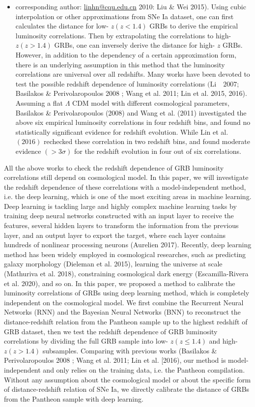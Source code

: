 \documentclass[10pt, a4paper]{article}
\begin{document}
\begin{itemize}
  \item corresponding author: \href{mailto:linhn@cqu.edu.cn}{linhn@cqu.edu.cn} 2010: Liu \& Wei 2015). Using cubic interpolation or other approximations from SNe Ia dataset, one can first calculates the distance for low- $z(z<1.4)$ GRBs to derive the empirical luminosity correlations. Then by extrapolating the correlations to high- $z(z>1.4)$ GRBs, one can inversely derive the distance for high- $z$ GRBs. However, in addition to the dependency of a certain approximation form, there is an underlying assumption in this method that the luminosity correlations are universal over all redshifts. Many works have been devoted to test the possible redshift dependence of luminosity correlations $(\mathrm{Li} \quad 2007$; Basilakos \& Perivolaropoulos 2008 ; Wang et al. 2011; Lin et al. 2015, 2016). Assuming a flat $\Lambda$ CDM model with different cosmological parameters, Basilakos \& Perivolaropoulos (2008) and Wang et al. (2011) investigated the above six empirical luminosity correlations in four redshift bins, and found no statistically significant evidence for redshift evolution. While Lin et al. $(2016)$ rechecked these correlation in two redshift bins, and found moderate evidence $(>3 \sigma)$ for the redshift evolution in four out of six correlations.
\end{itemize}
All the above works to check the redshift dependence of GRB luminosity correlations still depend on cosmological model. In this paper, we will investigate the redshift dependence of these correlations with a model-independent method, i.e. the deep learning, which is one of the most exciting areas in machine learning. Deep learning is tackling large and highly complex machine learning tasks by training deep neural networks constructed with an input layer to receive the features, several hidden layers to transform the information from the previous layer, and an output layer to export the target, where each layer contains hundreds of nonlinear processing neurons (Aurelien 2017). Recently, deep learning method has been widely employed in cosmological researches, such as predicting galaxy morphology (Dieleman et al. 2015), learning the universe at scale (Mathuriva et al. 2018), constraining cosmological dark energy (Escamilla-Rivera et al. 2020), and so on. In this paper, we proposed a method to calibrate the luminosity correlations of GRBs using deep learning method, which is completely independent on the cosmological model. We first combine the Recurrent Neural Networks (RNN) and the Bayesian Neural Networks (BNN) to reconstruct the distance-redshift relation from the Pantheon sample up to the highest redshift of GRB dataset, then we test the redshift dependence of GRB luminosity correlations by dividing the full GRB sample into low- $z(z \leq 1.4)$ and high- $z(z>1.4)$ subsamples. Comparing with previous works (Basilakos \& Perivolaropoulos 2008 ; Wang et al. 2011; Lin et al. [2016), our method is model-independent and only relies on the training data, i.e. the Pantheon compilation. Without any assumption about the cosmological model or about the specific form of distance-redshift relation of SNe Ia, we directly calibrate the distance of GRBs from the Pantheon sample with deep learning.
\end{document}
